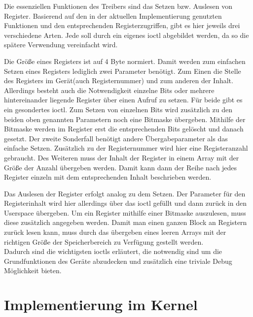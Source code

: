 Die essenziellen Funktionen des Treibers sind das Setzen bzw. Auslesen von Register. Basierend auf den in der aktuellen Implementierung genutzten Funktionen und den entsprechenden Registerzugriffen, gibt es hier jeweils drei verschiedene Arten. Jede soll durch ein eigenes \ac{ioctl} abgebildet werden, da so die spätere Verwendung vereinfacht wird. 


Die Größe eines Registers ist auf 4 Byte normiert. Damit werden zum einfachen Setzen eines Registers lediglich zwei Parameter benötigt. Zum Einen die Stelle des Registers im Gerät(auch Registernummer) und zum anderen der Inhalt. 
Allerdings besteht auch die Notwendigkeit einzelne Bits oder mehrere hintereinander liegende Register über einen Aufruf zu setzen. Für beide gibt es ein gesondertes \ac{ioctl}. Zum Setzen von einzelnen Bits wird zusätzlich zu den beiden oben genannten Parametern noch eine Bitmaske übergeben. Mithilfe der Bitmaske werden im Register erst die entsprechenden Bits gelöscht und danach gesetzt. 
Der zweite Sonderfall benötigt andere Übergabeparameter als das einfache Setzen. Zusätzlich zu der Registernummer wird hier eine Registeranzahl gebraucht. Des Weiteren muss der Inhalt der Register in einem Array mit der Größe der Anzahl übergeben werden. Damit kann dann der Reihe nach jedes Register einzeln mit dem entsprechenden Inhalt beschrieben werden.


Das Auslesen der Register erfolgt analog zu dem Setzen. Der Parameter für den Registerinhalt wird hier allerdings über das \ac{ioctl} gefüllt und dann zurück in den Userspace übergeben. 
Um ein Register mithilfe einer Bitmaske auszulesen, muss diese zusätzlich angegeben werden. Damit man einen ganzen Block an Registern zurück lesen kann, muss durch das übergeben eines leeren Arrays mit der richtigen Größe der Speicherbereich zu Verfügung gestellt werden.\\

Dadurch sind die wichtigsten \ac{ioctl}s erläutert, die notwendig sind um die Grundfunktionen des Geräte abzudecken und zusätzlich eine triviale Debug Möglichkeit bieten.

\section{Implementierung im Kernel}\label{sec:kernel}

